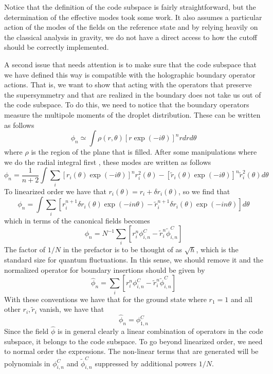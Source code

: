 \documentclass[12pt,nofootinbib, longbibliography]{revtex4-1}
\begin{document}
Notice that the definition of the code subspace is fairly straightforward, but the determination of the effective modes took some work. It also assumes a particular action of the modes of the fields on the reference state and by relying heavily on the classical analysis in gravity, we do not have a direct access to how the cutoff should be correctly implemented.

A second issue that needs attention is to make sure that the code subspace that we have defined this way is compatible with the holographic boundary operator actions. That is, we want to show that acting with the operators that preserve the supersymmetry and that are realized in the boundary does not take us out of the code subspace.
To do this, we need to notice that the boundary operators measure the multipole moments of the droplet distribution. These can be written as follows
\begin{equation}
\phi_n \simeq \int \rho(r,\theta) \left[r \exp(-i \theta)\right]^n r d r d \theta
\end{equation}
where $\rho$ is the region of the plane that is filled. After some manipulations where we do the radial integral first \cite{Berenstein:2016mxt}, these modes are written as follows
\begin{equation}
\phi_n = \frac{1}{ n+2} \int  \sum_i\left[r_i(\theta) \exp(-i \theta)\right]^n r_i^2(\theta)-\left[\tilde r_i(\theta) \exp(-i \theta)\right]^n \tilde r_i^2(\theta) d \theta
\end{equation}
To linearized order we have that 
$r_i(\theta) = r_i +\delta r_i(\theta)$, so we find that
\begin{equation}
\phi_n =  \int  \sum_i \left[r_i^{n+1} \delta r_i (\theta) \exp(-i n \theta)-\tilde r_i^{n+1}\delta r_i (\theta) \exp(-i n\theta) \right] d \theta
\end{equation}
which in terms of the canonical fields becomes
\begin{equation}
\phi_n= N^{-1} \sum_i \left[r_i^{n} \phi^C_{i,n} -\tilde r_i^{n}\tilde \phi^C_{i,n}  \right]
\end{equation}
The factor of $1/N$ in the prefactor is to be thought of as $\sqrt \hbar$, which is the standard size for quantum fluctuations.  In this sense, we should remove it and the normalized operator for boundary insertions should be given by
\begin{equation}
\hat \phi_n= \sum_i \left[r_i^{n} \phi^C_{i,n} -\tilde r_i^{n}\tilde \phi^C_{i,n}  \right] \label{eq:PartBog}
\end{equation}
With these conventions we have that for the ground state where $r_1=1$ and all other $r_i, \tilde r_i$ vanish, we have that 
\begin{equation}
\hat \phi_n= \phi^C_{1,n}
\end{equation}
Since the field $\hat \phi$ is in general clearly a linear combination of operators in the code subspace, it  belongs to the code subspace. To go beyond linearized order, we need to normal order the expressions. The non-linear terms that are generated will be polynomials in $\phi^C_{i,n}$ and $\tilde \phi^C_{i,n}$ suppressed by additional powers $1/N$. 
\end{document}
